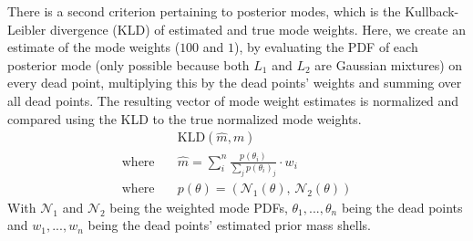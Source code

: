 \documentclass[12pt, a4paper]{report}
\begin{document}
There is a second criterion pertaining to posterior modes, which is the Kullback-Leibler divergence (KLD) of estimated and true mode weights.
Here, we create an estimate of the mode weights ($100$ and $1$), by evaluating the PDF of each posterior mode (only possible because both $L_1$ and $L_2$ are Gaussian mixtures) on every dead point, multiplying this by the dead points' weights and summing over all dead points.
The resulting vector of mode weight estimates is normalized and compared using the KLD to the true normalized mode weights.
\begin{align*}
    &\textrm{KLD}(\hat{m}, m) \\
    \textrm{where} \quad &\hat{m} = \sum_i^n \frac{p(\theta_i)}{\sum_j p(\theta_i)_j} \cdot w_i \\
    \textrm{where} \quad &p(\theta) = (\mathcal{N}_1(\theta), \, \mathcal{N}_2(\theta))
\end{align*}
With $\mathcal{N}_1$ and $\mathcal{N}_2$ being the weighted mode PDFs, $\theta_1, ..., \theta_n$ being the dead points and $w_1, ..., w_n$ being the dead points' estimated prior mass shells.
\end{document}
